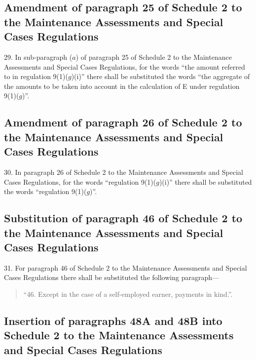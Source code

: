\documentclass[a4paper]{article}
\begin{document}
\subsection[29. Amendment of paragraph 25 of Schedule 2 to the Maintenance Assessments and Special Cases Regulations]{Amendment of paragraph 25 of Schedule 2 to the Maintenance Assessments and Special Cases Regulations}

29.  In sub-paragraph ($a$) of paragraph 25 of Schedule 2 to the Maintenance Assessments and Special Cases Regulations, for the words “the amount referred to in regulation 9(1)($g$)(i)” there shall be substituted the words “the aggregate of the amounts to be taken into account in the calculation of E under regulation 9(1)($g$)”.

\subsection[30. Amendment of paragraph 26 of Schedule 2 to the Maintenance Assessments and Special Cases Regulations]{Amendment of paragraph 26 of Schedule 2 to the Maintenance Assessments and Special Cases Regulations}

30.  In paragraph 26 of Schedule 2 to the Maintenance Assessments and Special Cases Regulations, for the words “regulation 9(1)($g$)(i)” there shall be substituted the words “regulation 9(1)($g$)”.

\subsection[31. Substitution of paragraph 46 of Schedule 2 to the Maintenance Assessments and Special Cases Regulations]{Substitution of paragraph 46 of Schedule 2 to the Maintenance Assessments and Special Cases Regulations}

31.  For paragraph 46 of Schedule 2 to the Maintenance Assessments and Special Cases Regulations there shall be substituted the following paragraph---
\begin{quotation}
“46.  Except in the case of a self-employed earner, payments in kind.”.
\end{quotation}

\subsection[32. Insertion of paragraphs 48A and 48B into Schedule 2 to the Maintenance Assessments and Special Cases Regulations]{Insertion of paragraphs 48A and 48B into Schedule 2 to the Maintenance Assessments and Special Cases Regulations}
\end{document}
